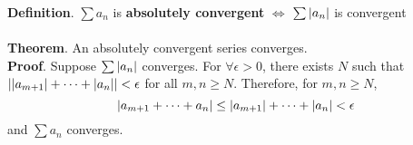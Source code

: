 \textbf{Definition}. $\sum a_n$ is \textbf{absolutely convergent} $\iff$ $\sum \left|a_n\right|$ is convergent\\
\\
\textbf{Theorem}. An absolutely convergent series converges.\\
\textbf{Proof}. Suppose $\sum \left|a_n\right|$ converges. For $\forall\epsilon>0$, there exists $N$ such that $\left|\left|a_{m+1}\right|+\cdots + \left|a_n\right|\right|<\epsilon$ for all $m, n\geq N$. Therefore, for $m, n\geq N$, $$\left|a_{m+1}+\cdots + a_n\right| \leq \left|a_{m+1}\right|+\cdots + \left|a_n\right| < \epsilon$$
and $\sum a_n$ converges.
\pagebreak